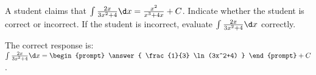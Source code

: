\documentclass{ximera}
\author{Jim Talamo}
\begin{document}
\begin{exercise}
A student claims that $\int \frac{2x}{3x^2+4} \d x = \frac{x^2}{x^3+4x}+C$.  Indicate whether the student is correct or incorrect.  If the student is incorrect, evaluate $\int \frac{2x}{3x^2+4} \d x$ correctly.

\begin{multipleChoice}  

The correct response is: $\int \frac{2x}{3x^2+4} \d x = \begin{prompt} \answer{ \frac{1}{3} \ln(3x^2+4) } \end{prompt} +C$.
\end{multipleChoice}


\end{exercise}
\end{document}
